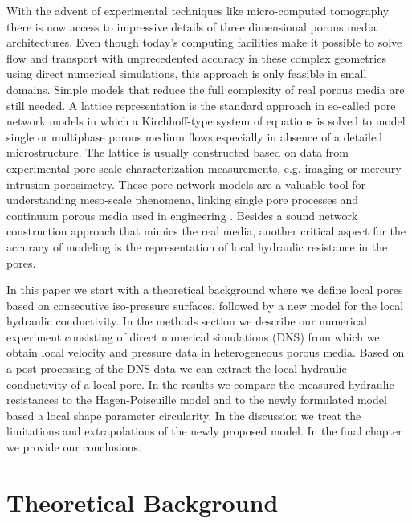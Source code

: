 \documentclass[draft]{agujournal2019}
\begin{document}
With the advent of experimental techniques like micro-computed tomography there is now access to impressive details of three dimensional porous media architectures. Even though today's computing facilities make it possible to solve flow and transport with unprecedented accuracy in these complex geometries using direct numerical simulations, this approach is only feasible in small domains. Simple models that reduce the full complexity of real porous media are still needed. A lattice representation is the standard approach in so-called pore network models in which a Kirchhoff-type system of equations is solved to model single or multiphase porous medium flows \cite{thompson_modeling_1997} especially in absence of a detailed microstructure. The lattice is usually constructed based on data from experimental pore scale characterization measurements, e.g. imaging or mercury intrusion porosimetry. These pore network models are a valuable tool for understanding meso-scale phenomena, linking single pore processes and continuum porous media used in engineering \cite{xiong_review_2016}. Besides a sound network construction approach that mimics the real media, another critical aspect for the accuracy of modeling is the representation of local hydraulic resistance in the pores. 


In this paper we start with a theoretical background where we define local pores based on consecutive iso-pressure surfaces, followed by a new model for the local hydraulic conductivity. In the methods section we describe our numerical experiment consisting of direct numerical simulations (DNS) from which we obtain local velocity and pressure data in heterogeneous porous media. Based on a post-processing of the DNS data we can extract the local hydraulic conductivity of a local pore. In the results we compare the measured hydraulic resistances to the Hagen-Poiseuille model and to the newly formulated model based a local shape parameter circularity. In the discussion we treat the limitations and extrapolations of the newly proposed model. In the final chapter we provide our conclusions.


\section{Theoretical Background}
\end{document}
